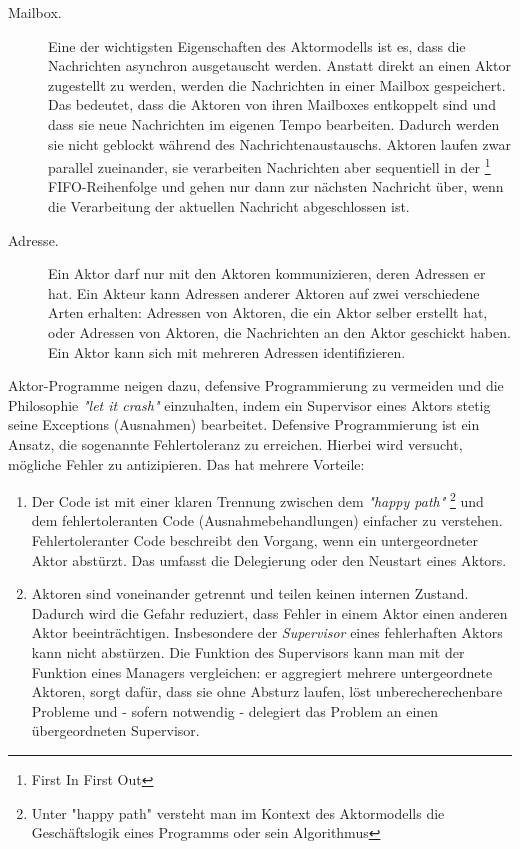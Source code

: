 \begin{description}
	\begin{description} 
		\item[Mailbox.] Eine der wichtigsten Eigenschaften des Aktormodells ist es, dass die Nachrichten asynchron ausgetauscht werden. Anstatt direkt an einen Aktor zugestellt zu werden, werden die Nachrichten in einer Mailbox gespeichert. Das bedeutet, dass die Aktoren von ihren Mailboxes entkoppelt sind und dass sie neue Nachrichten im eigenen Tempo bearbeiten. Dadurch werden sie nicht geblockt während des Nachrichtenaustauschs. Aktoren laufen zwar parallel zueinander, sie verarbeiten Nachrichten aber sequentiell in der \footnote{First In First Out} FIFO-Reihenfolge und gehen nur dann zur nächsten Nachricht über, wenn die Verarbeitung der aktuellen Nachricht abgeschlossen ist.
		
		\item[Adresse.] Ein Aktor darf nur mit den Aktoren kommunizieren, deren Adressen er hat. Ein Akteur kann Adressen anderer Aktoren auf zwei verschiedene Arten erhalten: Adressen von Aktoren, die ein Aktor selber erstellt hat, oder Adressen von Aktoren, die Nachrichten an den Aktor geschickt haben. Ein Aktor kann sich mit mehreren Adressen identifizieren.
	\end{description}
	
	Aktor-Programme neigen dazu, defensive Programmierung zu vermeiden und die Philosophie \textit{"let it crash"} einzuhalten, indem ein Supervisor eines Aktors stetig seine Exceptions (Ausnahmen) bearbeitet. Defensive Programmierung ist ein Ansatz, die sogenannte Fehlertoleranz zu erreichen. Hierbei wird versucht, mögliche Fehler zu antizipieren. Das hat mehrere Vorteile:
	
	\begin{enumerate}
		\item Der Code ist mit einer klaren Trennung zwischen dem \textit{"happy path"} \footnote{Unter "happy path" versteht man im Kontext des Aktormodells die Geschäftslogik eines Programms oder sein Algorithmus} und dem fehlertoleranten Code (Ausnahmebehandlungen) einfacher zu verstehen. Fehlertoleranter Code beschreibt den Vorgang, wenn ein untergeordneter Aktor abstürzt. Das umfasst die Delegierung oder den Neustart eines Aktors.
		
		\item Aktoren sind voneinander getrennt und teilen keinen internen Zustand. Dadurch wird die Gefahr reduziert, dass Fehler in einem Aktor einen anderen Aktor beeinträchtigen. Insbesondere der \textit{Supervisor} eines fehlerhaften Aktors kann nicht abstürzen. Die Funktion des Supervisors kann man mit der Funktion eines Managers vergleichen: er aggregiert mehrere untergeordnete Aktoren, sorgt dafür, dass sie ohne Absturz laufen, löst unberecherechenbare Probleme und - sofern notwendig -  delegiert das Problem an einen übergeordneten Supervisor.
	\end{enumerate}


\end{description}
